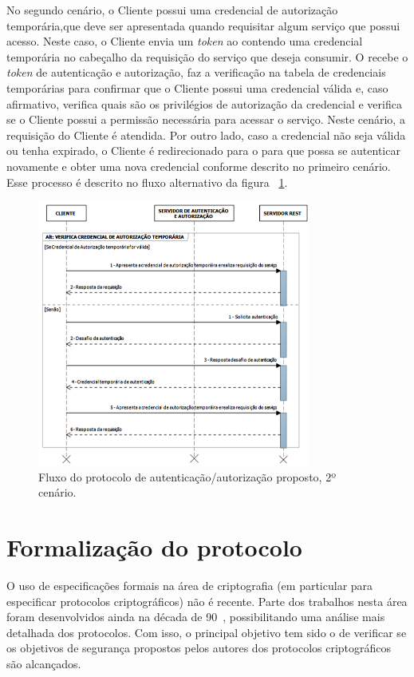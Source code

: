 No segundo cenário, o Cliente possui uma credencial de autorização temporária,que deve ser apresentada quando requisitar algum serviço que possui acesso.
Neste caso, o Cliente envia um \emph{token} ao \servidorRest{} contendo uma credencial temporária no cabeçalho da requisição do serviço que deseja consumir. O \servidorRest recebe o \emph{token} de autenticação e autorização, faz a verificação na tabela de credenciais temporárias para confirmar que o Cliente possui uma credencial válida e, caso afirmativo, verifica quais são os privilégios de autorização da credencial e verifica se o Cliente possui a permissão necessária para acessar o serviço. Neste cenário, a requisição do Cliente é atendida. Por outro lado, caso a credencial não seja válida ou tenha expirado, o Cliente é redirecionado para o \servidorAA{} para que possa se autenticar novamente e obter uma nova credencial conforme descrito no primeiro cenário. Esse processo é descrito no fluxo alternativo da figura ~\ref{fig:cenario2}.

\begin{figure}[!htb]
    \centering
     \includegraphics[width=0.8\textwidth]{cenario2_autenticacao.png}
     \caption{Fluxo do protocolo de autenticação/autorização proposto, 2º cenário.}
     \label{fig:cenario2}
\end{figure}


\section{Formalização do protocolo}

O uso de especificações formais na área de criptografia (em particular para especificar protocolos criptográficos)
não é recente. Parte dos trabalhos nesta área foram desenvolvidos ainda na década de 90~\cite{Meadows95}, possibilitando uma análise mais detalhada dos protocolos. Com isso, o principal objetivo tem sido o de verificar se os objetivos de segurança propostos pelos autores dos protocolos criptográficos são alcançados.


